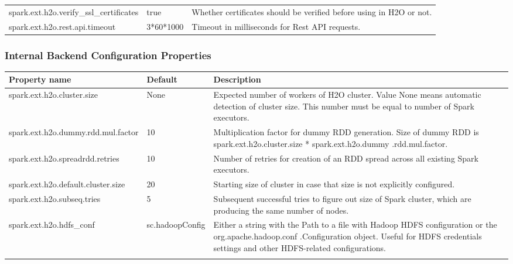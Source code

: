 \documentclass{standalone}
\begin{document}
\begin{footnotesize}
\begin{longtable}[!ht]{l p{2.0cm} p{3.0cm}}
			spark.ext.h2o.verify\_ssl\_certificates & true & Whether certificates should be verified before using in H2O or not. \\ \addlinespace

			spark.ext.h2o.rest.api.timeout & 3*60*1000 & Timeout in milliseconds for Rest API requests. \\

			\bottomrule
		\end{longtable}
	\end{footnotesize}


	\subsubsection{Internal Backend Configuration Properties}
	\begin{footnotesize}
		\begin{longtable}[!ht]{l p{2.0cm} p{3.0cm}}
			\toprule
			Property name & Default & Description \\
			\midrule

			spark.ext.h2o.cluster.size & None & Expected number of workers of H2O cluster. Value None means automatic detection of cluster size. This number must be equal to number of Spark executors. \\ \addlinespace

			spark.ext.h2o.dummy.rdd.mul.factor & 10 & Multiplication factor for dummy RDD generation. Size of dummy RDD is spark.ext.h2o.cluster.size * spark.ext.h2o.dummy .rdd.mul.factor. \\ \addlinespace

			spark.ext.h2o.spreadrdd.retries & 10 & Number of retries for creation of an RDD spread across all existing Spark executors. \\ \addlinespace

			spark.ext.h2o.default.cluster.size & 20 & Starting size of cluster in case that size is not explicitly configured. \\ \addlinespace

			spark.ext.h2o.subseq.tries & 5 & Subsequent successful tries to figure out size of Spark cluster, which are producing the same number of nodes. \\ \addlinespace

			spark.ext.h2o.hdfs\_conf & sc.hadoopConfig & Either a string with the Path to a file with Hadoop HDFS configuration or the org.apache.hadoop.conf .Configuration object. Useful for HDFS credentials settings and other HDFS-related configurations. \\ \addlinespace


\end{longtable}
\end{footnotesize}
\end{document}
